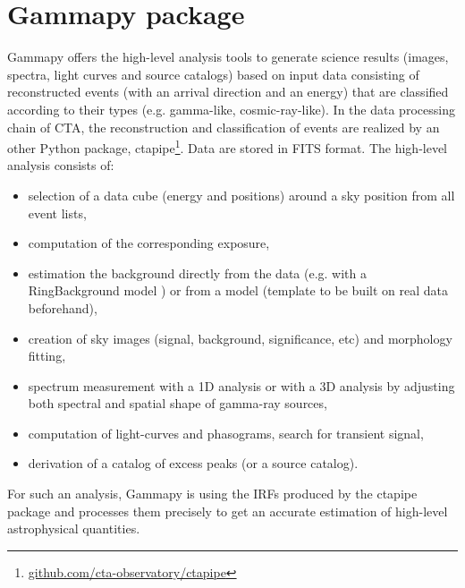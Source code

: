 \documentclass{PoS}
\newcommand{\urlCtaPipe}{\href{https://github.com/cta-observatory/ctapipe}{github.com/cta-observatory/ctapipe}}
\begin{document}


\section{Gammapy package}
\label{sec:package}

Gammapy offers the high-level analysis tools to generate science results (images, spectra,
light curves and source catalogs) based on input data consisting of 
reconstructed events (with an arrival direction and an energy) that are 
classified according to their types (e.g. gamma-like, cosmic-ray-like). 
In the data processing chain of CTA, the reconstruction and classification 
of events are realized by an other Python package, ctapipe\footnote{\urlCtaPipe}. Data are stored in FITS format. 
The high-level analysis consists of: 
\vspace{-0.3cm}
\begin{itemize}
\setlength\itemsep{-0.5em}
\item selection of a data cube (energy and positions) around a sky position from all event
lists,
\item computation of the corresponding exposure,
\item estimation the background directly from the data (e.g. with a RingBackground model \cite{berge}) 
or from a model (template to be built on real data beforehand),
\item creation of sky images (signal, background, significance, etc) and morphology fitting,
\item spectrum measurement with a 1D analysis or with a 3D analysis by adjusting both spectral and spatial shape of gamma-ray sources,
\item computation of light-curves and phasograms, search for transient signal,
\item derivation of a catalog of excess peaks (or a source catalog).
\end{itemize}
\vspace{-0.28cm}
For such an analysis, Gammapy is using the IRFs produced by the ctapipe  package and 
processes them precisely to get an accurate estimation of high-level astrophysical quantities.
\end{document}
